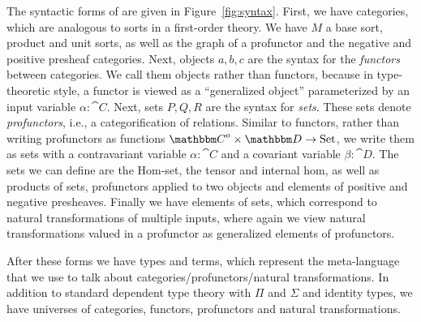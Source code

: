 \documentclass{llncs}
\begin{document}
The syntactic forms of \vett{} are given in
Figure~\ref{fig:syntax}.
%
First, we have categories, which are analogous to sorts in a
first-order theory. We have $M$ a base sort, product and unit sorts,
as well as the graph of a profunctor and the negative and positive
presheaf categories.
%
Next, objects $a,b,c$ are the syntax for the \emph{functors} between
categories. We call them objects rather than functors, because in
type-theoretic style, a functor is viewed as a ``generalized object''
parameterized by an input variable $\alpha : \cat C$.
%
Next, sets $P,Q,R$ are the syntax for \emph{sets}. These sets denote
\emph{profunctors}, i.e., a categorification of relations. Similar to
functors, rather than writing profunctors as functions ${\cat
  C}^o\times {\cat D} \to \Set$, we write them as sets with a
contravariant variable $\alpha:\cat C$ and a covariant variable
$\beta:\cat D$. The sets we can define are the Hom-set, the tensor and
internal hom, as well as products of sets, profunctors applied to two
objects and elements of positive and negative presheaves. Finally we
have elements of sets, which correspond to natural transformations of
multiple inputs, where again we view natural transformations valued in
a profunctor as generalized elements of profunctors.

After these forms we have types and terms, which represent the
meta-language that we use to talk about categories/profunctors/natural
transformations.  In addition to standard dependent type theory with
$\Pi$ and $\Sigma$ and identity types, we have universes of
categories, functors, profunctors and natural transformations.
\end{document}
